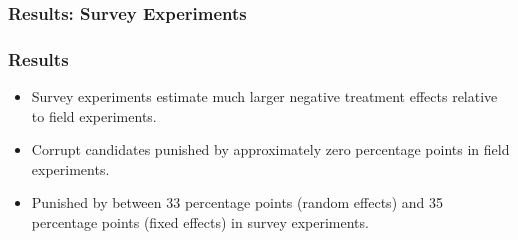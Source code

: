 \documentclass[usenames,dvipsnames]{beamer}
\begin{document}

\begin{frame}
\frametitle{Results: Survey Experiments}


\end{frame}


\begin{frame}[label = results]
\frametitle{Results}
\begin{itemize}
\item Survey experiments estimate much larger negative treatment effects relative to field experiments. \hyperlink{lab}{}
\pause
\item Corrupt candidates punished by approximately \textcolor{Cerulean}{zero percentage points} in field experiments.
\pause
\item Punished by between \textcolor{Cerulean}{33 percentage points} (random effects) and \textcolor{Cerulean}{35 percentage points} (fixed effects) in survey experiments.
\vspace{0.05cm}
\end{itemize}
\end{frame}

\end{document}
